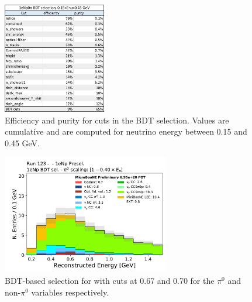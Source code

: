 \begin{figure}[H]
\begin{center}
\includegraphics[width=0.40\textwidth]{1eNp/cuts-eff-pur-bdt.pdf}
\caption{\label{fig:1eNp:cutflow:bdt} Efficiency and purity for cuts in the BDT \npsel selection. Values are cumulative and are computed for neutrino energy between 0.15 and 0.45 GeV. }
\end{center}
\end{figure}

\begin{figure}[H]
\begin{center}
\includegraphics[width=0.65\textwidth]{1eNp/reco_e_BDT.pdf}
\caption{\label{fig:1eNp:bdt:1e21}BDT-based selection for \npsel with cuts at 0.67 and 0.70 for the $\pi^0$ and non-$\pi^0$ variables respectively.}
\end{center}
\end{figure}

